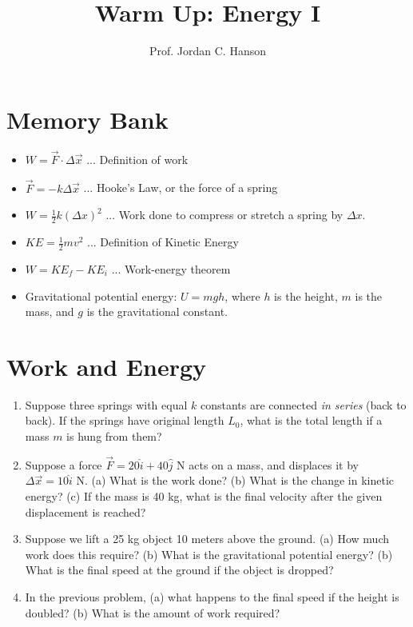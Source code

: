 \documentclass{article}
\begin{document}
\twocolumn

\title{Warm Up: Energy I}
\author{Prof. Jordan C. Hanson}

\maketitle

\section{Memory Bank}

\begin{itemize}
\item $W = \vec{F} \cdot \Delta \vec{x}$ ... Definition of work
\item $\vec{F} = -k\Delta \vec{x}$ ... Hooke's Law, or the force of a spring
\item $W = \frac{1}{2}k(\Delta x)^2$ ... Work done to compress or stretch a spring by $\Delta x$.
\item $KE = \frac{1}{2}m v^2$ ... Definition of Kinetic Energy
\item $W = KE_f - KE_i$ ... Work-energy theorem
\item Gravitational potential energy: $U = mgh$, where $h$ is the height, $m$ is the mass, and $g$ is the gravitational constant.
\end{itemize}

\section{Work and Energy}

\begin{enumerate}
\item Suppose three springs with equal $k$ constants are connected \textit{in series} (back to back).  If the springs have original length $L_0$, what is the total length if a mass $m$ is hung from them? \\ \vspace{4cm}
\item Suppose a force $\vec{F} = 20\hat{i} + 40\hat{j}$ N acts on a mass, and displaces it by $\Delta \vec{x} = 10\hat{i}$ N.  (a) What is the work done?  (b) What is the change in kinetic energy? (c) If the mass is 40 kg, what is the final velocity after the given displacement is reached? \\ \vspace{4cm}
\item Suppose we lift a 25 kg object 10 meters above the ground.  (a) How much work does this require? (b) What is the gravitational potential energy? (b) What is the final speed at the ground if the object is dropped? \\ \vspace{3cm}
\item In the previous problem, (a) what happens to the final speed if the height is doubled? (b) What is the amount of work required?
\end{enumerate}
\end{document}
